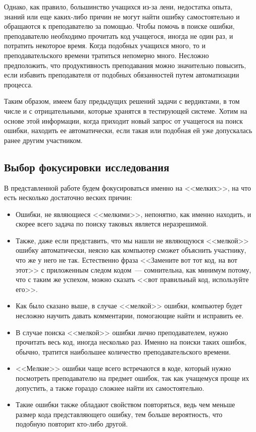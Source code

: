 Однако, как правило, большинство учащихся из-за лени, недостатка опыта, знаний или еще каких-либо причин не могут найти ошибку
самостоятельно и обращаются к преподавателю за помощью. Чтобы помочь в поиске ошибки, преподавателю необходимо прочитать код учащегося,
иногда не один раз, и потратить некоторое время. Когда подобных учащихся много, то и преподавательского времени тратиться 
непомерно много. Несложно предположить, что продуктивность преподавания можно значительно повысить, если избавить преподавателя от 
подобных обязанностей путем автоматизации процесса.

Таким образом, имеем базу предыдущих решений задачи с вердиктами, в том числе и с отрицательными, которые хранятся в 
тестирующей системе. Хотим на основе этой информации, когда приходит новый запрос от учащегося на поиск ошибки, 
находить ее автоматически, если такая или подобная ей уже допускалась ранее другим участником. 

\subsection{Выбор фокусировки исследования}
В представленной работе будем фокусироваться именно на <<мелких>>, на что есть несколько достаточно веских причин:
\begin{itemize}
    \item Ошибки, не являющиеся <<мелкими>>, непонятно, как именно находить, и скорее всего задача по поиску таковых
        является неразрешимой.
    \item Также, даже если представить, что мы нашли не являющуюся <<мелкой>> ошибку автоматически, неясно как
        компьютер сможет объяснить участнику, что же у него не так. Естественно фраза <<Замените вот тот код, на вот этот>>
        с приложенным следом кодом~--- сомнительна, как минимум потому, что с таким же успехом, можно сказать <<вот правильный
        код, используйте его>>.
    \item Как было сказано выше, в случае <<мелкой>> ошибки, компьютер будет несложно научить давать комментарии, помогающие
        найти и исправить ее. 
    \item В случае поиска <<мелкой>> ошибки лично преподавателем, нужно прочитать
        весь код, иногда несколько раз. Именно на поиски таких ошибок, обычно, тратится наибольшее количество
        преподавательского времени.
    \item <<Мелкие>> ошибки чаще всего встречаются в коде, который нужно посмотреть преподавателю на предмет ошибок, 
        так как учащемуся проще их допустить, а также гораздо сложнее найти их самостоятельно.
    \item Такие ошибки также обладают свойством повторяться, ведь чем меньше размер кода представляющего ошибку, 
        тем больше вероятность, что подобную повторит кто-либо другой.
\end{itemize}


